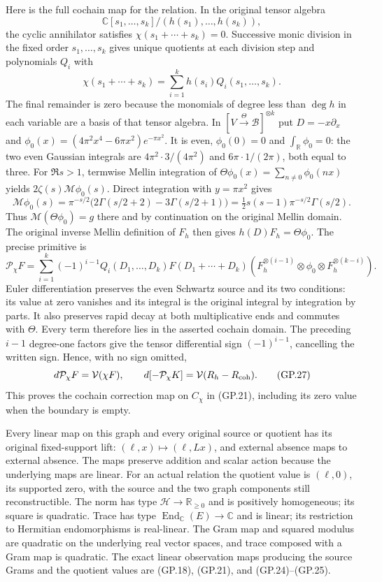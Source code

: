 \documentclass[11pt]{article}
\newcommand{\C}{\mathbb C}
\newcommand{\R}{\mathbb R}
\newcommand{\HH}{\mathcal H}
\newcommand{\V}{\mathcal V}
\begin{document}
Here is the full cochain map for the relation. In the original tensor algebra
\[
 \C[s_1,\ldots,s_k]/(h(s_1),\ldots,h(s_k)),
\]
the cyclic annihilator satisfies $\chi(s_1+\cdots+s_k)=0$. Successive monic
division in the fixed order $s_1,\ldots,s_k$ gives unique quotients
at each division step and polynomials $Q_i$ with
\[
 \chi(s_1+\cdots+s_k)=\sum_{i=1}^k h(s_i)Q_i(s_1,\ldots,s_k).
\]
The final remainder is zero because the monomials of degree less
than $\deg h$ in each variable are a basis of that tensor algebra.
In $[V\xrightarrow{\Theta}\mathscr B]^{\otimes k}$ put
$D=-x\partial_x$ and
$\phi_0(x)=(4\pi^2x^4-6\pi x^2)e^{-\pi x^2}$. It is even,
$\phi_0(0)=0$ and $\int_\R\phi_0=0$: the two even Gaussian
integrals are $4\pi^2\cdot3/(4\pi^2)$ and
$6\pi\cdot1/(2\pi)$, both equal to three. For $\Re s>1$,
termwise Mellin integration of
$\Theta\phi_0(x)=\sum_{n\ne0}\phi_0(nx)$ yields
$2\zeta(s)\mathcal M\phi_0(s)$. Direct integration with
$y=\pi x^2$ gives
\[
 \mathcal M\phi_0(s)=\pi^{-s/2}
 \bigl(2\Gamma(s/2+2)-3\Gamma(s/2+1)\bigr)
 =\tfrac12s(s-1)\pi^{-s/2}\Gamma(s/2).
\]
Thus $\mathcal M(\Theta\phi_0)=g$ there and by continuation on
the original Mellin domain. The original inverse Mellin definition
of $F_h$ then gives $h(D)F_h=\Theta\phi_0$. The precise primitive is
\begin{equation}
 \mathcal P_\chi F=
 \sum_{i=1}^k(-1)^{i-1}Q_i(D_1,\ldots,D_k)
 F(D_1+\cdots+D_k)
 (F_h^{\otimes(i-1)}\otimes\phi_0\otimes F_h^{\otimes(k-i)}).
 \tag{GP.26}
\end{equation}
Euler differentiation preserves the even Schwartz source and its
two conditions: its value at zero vanishes and its integral is the
original integral by integration by parts. It also preserves rapid
decay at both multiplicative ends and commutes with $\Theta$.
Every term therefore lies in the asserted cochain domain. The
preceding $i-1$ degree-one factors give the tensor differential sign
$(-1)^{i-1}$, cancelling the written sign. Hence, with no sign omitted,
\begin{equation}
 d\mathcal P_\chi F=\V(\chi F),\qquad
 d[-\mathcal P_\chi K]=\V(R_h-R_{\rm coh}).
 \tag{GP.27}
\end{equation}
This proves the cochain correction map on $C_\chi$ in (GP.21),
including its zero value when the boundary is empty.

Every linear map on this graph and every original source or quotient
has its original fixed-support lift: $(\ell,x)\mapsto(\ell,Lx)$,
and external absence maps to external absence. The maps preserve
addition and scalar action because the underlying maps are linear.
For an actual relation the quotient value is $(\ell,0)$, its supported
zero, with the source and the two graph components still reconstructible.
The norm has type $\HH\to\R_{\geq0}$ and is positively homogeneous;
its square is quadratic. Trace has type
$\operatorname{End}_{\C}(E)\to\C$ and is linear; its restriction to
Hermitian endomorphisms is real-linear. The Gram map and squared
modulus are quadratic on the underlying real vector spaces, and
trace composed with a Gram map is quadratic. The exact linear
observation maps producing the source Grams and the quotient values
are (GP.18), (GP.21), and (GP.24)--(GP.25).
\end{document}
